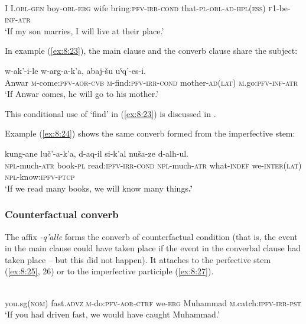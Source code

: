 ﻿\documentclass[output=paper]{langsci/langscibook}
\begin{document}
\ex \label{ex:8:22} %
\\
I I.\textsc{obl}-\textsc{gen} boy-\textsc{obl}-\textsc{erg} wife  bring:\textsc{pfv}-\textsc{irr}-\textsc{cond} that-\textsc{pl}-\textsc{obl}-\textsc{ad}-\textsc{hpl}(\textsc{ess}) \textsc{f1}-be-\textsc{inf}-\textsc{atr}\\
\glt `If my son marries, I will live at their place.' \citep{dobrushina2019}
\z

In example (\ref{ex:8:23}), the main clause and the converb clause share
the subject:

\ea \label{ex:8:23} %
 {w-ak'-i-le} {w-arg-a-k'a,} {abaj-šu} {uˤq'-es-i}.\\
Anwar \textsc{m}-come:\textsc{pfv}-\textsc{aor}-\textsc{cvb} \textsc{m}-find:\textsc{pfv}-\textsc{irr}-\textsc{cond} mother-\textsc{ad}(\textsc{lat}) \textsc{m}.go:\textsc{pfv}-\textsc{inf}-\textsc{atr}\\
\glt `If Anwar comes, he will go to his mother.' \citep{dobrushina2019}
\z

This conditional use of `find' in (\ref{ex:8:23}) is discussed in \citet{maisak-daniel2018}.

Example (\ref{ex:8:24}) shows the same converb formed from the
imperfective stem:

\ea \label{ex:8:24} %
 {kung-ane} {luč'-a-k'a,} {d-aq-il} {si-k'al} {nuša-ze} {d-alh-ul}.\\
\textsc{npl}-much-\textsc{atr} book-\textsc{pl} read:\textsc{ipfv}-\textsc{irr}-\textsc{cond} \textsc{npl}-much-\textsc{atr} what-\textsc{indef} we-\textsc{inter}(\textsc{lat}) \textsc{npl}-know:\textsc{ipfv}-\textsc{ptcp}\\
\glt `If we read many books, we will know many things\textbf{.'}
\z

\subsubsection{Counterfactual converb}

The affix \emph{-q'alle} forms the converb of counterfactual condition
(that is, the event in the main clause could have taken place if the
event in the converbal clause had taken place -- but this did not
happen). It attaches to the perfective stem (\ref{ex:8:25}, 26) or to the imperfective
participle (\ref{ex:8:27}).

\ea \label{ex:8:25} %
\\
you.sg(\textsc{nom}) fast.\textsc{advz} \textsc{m}-do:\textsc{pfv}-\textsc{aor}-\textsc{ctrf}
we-\textsc{erg} Muhammad \textsc{m}.catch:\textsc{ipfv}-\textsc{irr}-\textsc{pst}\\
\glt `If you had driven fast, we would have caught Muhammad.'
\end{document}
